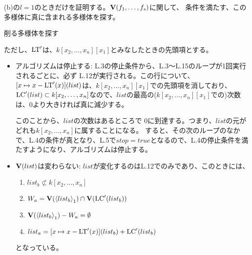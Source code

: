 \documentclass[9pt]{ltjsarticle}
\begin{document}
\begin{myproof}
  (b)の$l=1$のときだけを証明する。$\textbf V(f_1,\dots,f_s)$に関して、
  条件を満たす、この多様体に真に含まれる多様体を探す。
  \begin{algorithm}[H]
    \caption{削る多様体を探す}
    \begin{algorithmic}[1]
      \ELSE{}
        \ELSE{}
        \ENDIF{}
      \ENDIF{}
      \ENDWHILE{}
    \end{algorithmic}
  \end{algorithm}
  ただし、${\rm LT}'$は、$k[x_2,\dots,x_n][x_1]$とみなしたときの先頭項とする。
  \begin{itemize}
    \item アルゴリズムは停止する:
    L.3の停止条件から、L.3～L.15のループが1回実行されるごとに、必ず
    L.12が実行される。この行について、
    $[x\mapsto x-{\rm LT}'(x)](list)$は、$k[x_2,\dots,x_n][x_1]$での先頭項を消しており、
    ${\rm LC}'(list)\subset k[x_2,\dots,x_n]$なので、$list$の最高の($k[x_2,\dots,x_n][x_1]$での)次数は、$0$より大きければ真に減少する。

    このことから、$list$の次数はあるところで
    $0$に到達する。つまり、$list$の元がどれも$k[x_2,\dots,x_n]$に属することになる。
    すると、その次のループのなかで、L.4の条件が真となり、L.5で$stop = true$となるので、L.4の停止条件を満たすようになり、アルゴリズムは停止する。
    \item $\textbf V(list)$は変わらない:
    $list$が変化するのはL.12でのみであり、このときには、
    \begin{enumerate}[label=(\alph*)]
      \item  $list_b \not\subset k[x_2,\dots,x_n]$
      \item $W_a = \textbf V(\left\langle list_b \right\rangle_1)\cap \textbf V({\rm LC}'(list_b))$
      \item $\textbf V(\left\langle list_b \right\rangle_1) - W_a = \emptyset$
      \item $list_a = [x\mapsto x-{\rm LT}'(x)](list_b) + {\rm LC}'(list_b)$
    \end{enumerate}
    となっている。


\end{itemize}
\end{myproof}
\end{document}
